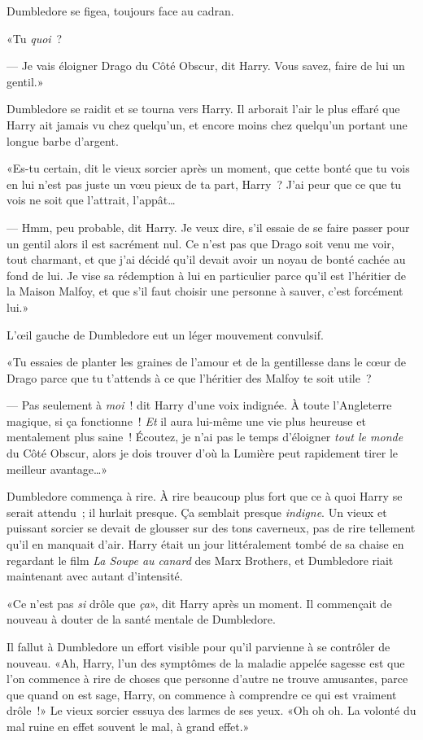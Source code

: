 Dumbledore se figea, toujours face au cadran.

«Tu \emph{quoi}~?

--- Je vais éloigner Drago du Côté Obscur, dit Harry. Vous savez, faire de lui un gentil.»

Dumbledore se raidit et se tourna vers Harry. Il arborait l'air le plus effaré que Harry ait jamais vu chez quelqu'un, et encore moins chez quelqu'un portant une longue barbe d'argent.

«Es-tu certain, dit le vieux sorcier après un moment, que cette bonté que tu vois en lui n'est pas juste un vœu pieux de ta part, Harry~? J'ai peur que ce que tu vois ne soit que l'attrait, l'appât…

--- Hmm, peu probable, dit Harry. Je veux dire, s'il essaie de se faire passer pour un gentil alors il est sacrément nul. Ce n'est pas que Drago soit venu me voir, tout charmant, et que j'ai décidé qu'il devait avoir un noyau de bonté cachée au fond de lui. Je vise sa rédemption à lui en particulier parce qu'il est l'héritier de la Maison Malfoy, et que s'il faut choisir une personne à sauver, c'est forcément lui.»

L'œil gauche de Dumbledore eut un léger mouvement convulsif.

«Tu essaies de planter les graines de l'amour et de la gentillesse dans le cœur de Drago parce que tu t'attends à ce que l'héritier des Malfoy te soit utile~?

--- Pas seulement à \emph{moi}~! dit Harry d'une voix indignée. À toute l'Angleterre magique, si ça fonctionne~! \emph{Et} il aura lui-même une vie plus heureuse et mentalement plus saine~! Écoutez, je n'ai pas le temps d'éloigner \emph{tout le monde} du Côté Obscur, alors je dois trouver d'où la Lumière peut rapidement tirer le meilleur avantage…»

Dumbledore commença à rire. À rire beaucoup plus fort que ce à quoi Harry se serait attendu~; il hurlait presque. Ça semblait presque \emph{indigne}. Un vieux et puissant sorcier se devait de glousser sur des tons caverneux, pas de rire tellement qu'il en manquait d'air. Harry était un jour littéralement tombé de sa chaise en regardant le film \emph{La Soupe au canard} des Marx Brothers, et Dumbledore riait maintenant avec autant d'intensité.

«Ce n'est pas \emph{si} drôle que \emph{ça}», dit Harry après un moment. Il commençait de nouveau à douter de la santé mentale de Dumbledore.

Il fallut à Dumbledore un effort visible pour qu'il parvienne à se contrôler de nouveau. «Ah, Harry, l'un des symptômes de la maladie appelée sagesse est que l'on commence à rire de choses que personne d'autre ne trouve amusantes, parce que quand on est sage, Harry, on commence à comprendre ce qui est vraiment drôle~!» Le vieux sorcier essuya des larmes de ses yeux. «Oh oh oh. La volonté du mal ruine en effet souvent le mal, à grand effet.»

